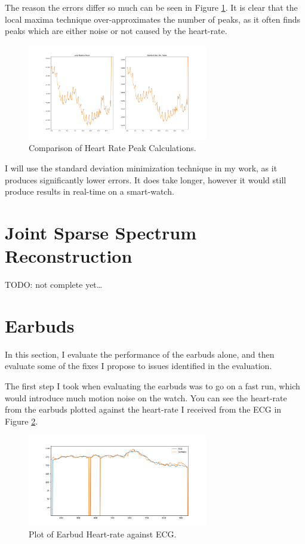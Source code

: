 \documentclass[12pt,a4paper,twoside,openright]{report}
\begin{document}
The reason the errors differ so much can be seen in Figure
\ref{fig:hr-peak-comparison}. It is clear that the local maxima technique
over-approximates the number of peaks, as it often finds peaks which are
either noise or not caused by the heart-rate.

\begin{figure}[tbh]
	\centering
	\includegraphics[width=0.7\textwidth]{figs/peak-comparison.png}
	\caption{Comparison of Heart Rate Peak Calculations.}
	\label{fig:hr-peak-comparison}
\end{figure}

I will use the standard deviation minimization technique in my work, as it
produces significantly lower errors. It does take longer, however it would
still produce results in real-time on a smart-watch.

\section{Joint Sparse Spectrum Reconstruction}

TODO: not complete yet\ldots

\section{Earbuds}

In this section, I evaluate the performance of the earbuds alone, and then
evaluate some of the fixes I propose to issues identified in the evaluation.

The first step I took when evaluating the earbuds was to go on a fast run,
which would introduce much motion noise on the watch. You can see the
heart-rate from the earbuds plotted against the heart-rate I received from the
ECG in Figure \ref{fig:earbud-fast}.

\begin{figure}[tbh]
	\centerline{\includegraphics[width=0.7\textwidth]{figs/earbud-fast-graph.png}}
	\caption{Plot of Earbud Heart-rate against ECG.}
	\label{fig:earbud-fast}
\end{figure}
\end{document}
